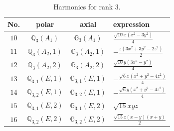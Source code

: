 \documentclass[fleqn,8pt,landscape]{jsarticle}
\begin{document}
\begin{table}[ht!]
\begin{center}
\caption{Harmonics for rank 3.}
\renewcommand{\arraystretch}{1.3}
\begin{tabular}{cccl} \hline \hline
No. & polar & axial & expression \\ \hline
$ 10 $ & $ \mathbb{Q}_{3}(A_{1}) $ & $ \mathbb{G}_{3}(A_{1}) $ & $ \frac{\sqrt{10} x \left(x^{2} - 3 y^{2}\right)}{4} $ \\
$ 11 $ & $ \mathbb{Q}_{3}(A_{2},1) $ & $ \mathbb{G}_{3}(A_{2},1) $ & $ - \frac{z \left(3 x^{2} + 3 y^{2} - 2 z^{2}\right)}{2} $ \\
$ 12 $ & $ \mathbb{Q}_{3}(A_{2},2) $ & $ \mathbb{G}_{3}(A_{2},2) $ & $ \frac{\sqrt{10} y \left(3 x^{2} - y^{2}\right)}{4} $ \\
$ 13 $ & $ \mathbb{Q}_{3,1}(E,1) $ & $ \mathbb{G}_{3,1}(E,1) $ & $ - \frac{\sqrt{6} x \left(x^{2} + y^{2} - 4 z^{2}\right)}{4} $ \\
$ 14 $ & $ \mathbb{Q}_{3,2}(E,1) $ & $ \mathbb{G}_{3,2}(E,1) $ & $ - \frac{\sqrt{6} y \left(x^{2} + y^{2} - 4 z^{2}\right)}{4} $ \\
$ 15 $ & $ \mathbb{Q}_{3,1}(E,2) $ & $ \mathbb{G}_{3,1}(E,2) $ & $ \sqrt{15} x y z $ \\
$ 16 $ & $ \mathbb{Q}_{3,2}(E,2) $ & $ \mathbb{G}_{3,2}(E,2) $ & $ \frac{\sqrt{15} z \left(x - y\right) \left(x + y\right)}{2} $ \\
 \hline \hline
\end{tabular}
\end{center}
\end{table}
\end{document}
